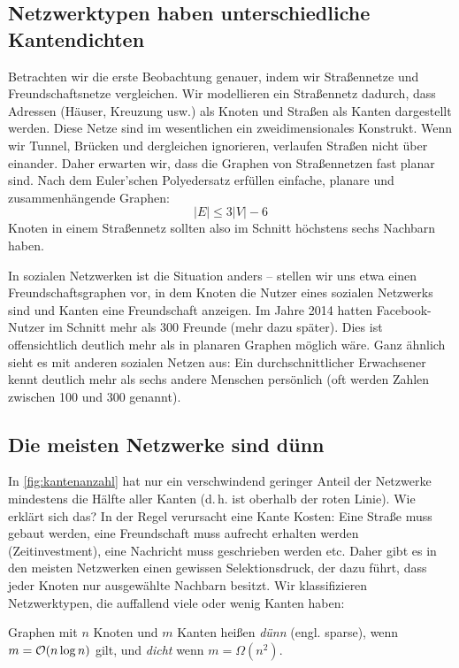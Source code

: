 \subsection{Netzwerktypen haben unterschiedliche Kantendichten}
Betrachten wir die erste Beobachtung genauer, indem wir Straßennetze und Freundschaftsnetze vergleichen.
Wir modellieren ein Straßennetz dadurch, dass Adressen (Häuser, Kreuzung usw.) als Knoten und Straßen als Kanten dargestellt werden.
Diese Netze  sind im wesentlichen ein zweidimensionales Konstrukt.
Wenn wir Tunnel, Brücken und dergleichen ignorieren, verlaufen Straßen nicht über einander.
Daher erwarten wir, dass die Graphen von Straßennetzen fast planar sind.
Nach dem Euler'schen Polyedersatz erfüllen einfache,  planare und zusammenhängende Graphen:
\begin{equation}
    |E| \le 3 |V| - 6
\end{equation}
Knoten in einem Straßennetz sollten also im Schnitt höchstens sechs Nachbarn haben.

In  sozialen Netzwerken ist die Situation anders --
stellen wir uns etwa einen Freundschaftsgraphen vor, in dem Knoten die Nutzer eines sozialen Netzwerks sind und Kanten eine Freundschaft anzeigen.
Im Jahre 2014 hatten Facebook-Nutzer im Schnitt mehr als 300 Freunde (mehr dazu später).
Dies ist offensichtlich deutlich mehr als in planaren Graphen möglich wäre.
Ganz ähnlich sieht es mit anderen sozialen Netzen aus: Ein durchschnittlicher Erwachsener kennt deutlich mehr als sechs andere Menschen persönlich (oft werden Zahlen zwischen 100 und 300 genannt).

\subsection{Die meisten Netzwerke sind dünn}
In \cref{fig:kantenanzahl} hat nur ein verschwindend geringer Anteil der Netzwerke mindestens die Hälfte aller Kanten (d.\,h. ist oberhalb der roten Linie).
Wie erklärt sich das?
In der Regel verursacht eine Kante Kosten:
Eine Straße muss gebaut werden, eine Freundschaft muss aufrecht erhalten werden (Zeitinvestment), eine Nachricht muss geschrieben werden etc.
Daher gibt es in den meisten Netzwerken einen gewissen Selektionsdruck, der dazu führt, dass jeder Knoten nur ausgewählte Nachbarn besitzt.
Wir klassifizieren Netzwerktypen, die auffallend viele oder wenig Kanten haben:

\begin{definition}
    Graphen  mit $n$ Knoten und $m$ Kanten heißen \emph{dünn} (engl. sparse), wenn $m = \mathcal{O}\!\left(n \log n\right)$ gilt, und \emph{dicht} wenn $m = \Omega(n^2)$.
\end{definition}

